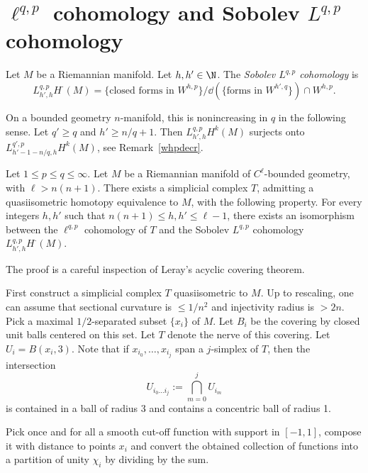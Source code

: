 \section{\texorpdfstring{$\ell^{q,p}$}{ell(q,p)} cohomology and Sobolev \texorpdfstring{$L^{q,p}$}{L(q,p)} cohomology}\label{sec:leray}

\begin{defi}
Let $M$ be a Riemannian manifold. Let $h, h'\in\N$. The
\emph{Sobolev $L^{q,p}$ cohomology} is
\[
L_{h',h}^{q,p}H^{\cdot}(M)=\{\text{closed forms in }W^{h,p}\} / \dd(\{\text{forms in }W^{h',q}\}) \cap W^{h,p}.
\]
\end{defi}

\begin{rema}\label{rem:decreasing}
On a bounded geometry $n$-manifold, this is nonincreasing in $q$ in the following sense. Let $q'\geq q$ and $h'\geq n/q + 1$. Then $L_{h',h}^{q,p}H^{k}(M)$ surjects onto $L_{h'-1 - n/q,h}^{q',p}H^{k}(M)$, see Remark~\ref{whpdecr}.
\end{rema}

\begin{theo}\label{prop:leray}
Let $1\leq p\leq q\leq \infty$. Let $M$ be a Riemannian manifold of $C^\ell$-bounded geometry, with $\ell > n(n+1)$. There exists a simplicial complex $T$, admitting a quasiisometric homotopy equivalence to $M$, with the following property. For every integers $h,h'$ such that $n(n+1) \leq h,h'\leq \ell -1$, there exists an isomorphism between the $\ell^{q,p}$ cohomology of $T$ and the Sobolev $L^{q,p}$ cohomology $L_{h',h}^{q,p}H^{\cdot}(M)$.
\end{theo}

The proof is a careful inspection of Leray's acyclic covering theorem.

First construct a simplicial complex $T$ quasiisometric to $M$. Up to rescaling, one can assume that sectional curvature is $\leq 1/n^2$ and injectivity radius is $>2n$. Pick a maximal $1/2$-separated subset $\{x_i\}$ of $M$. Let $B_i$ be the covering by closed unit balls centered on this set. Let $T$ denote the nerve of this covering. Let $U_i=B(x_i,3)$. Note that if $x_{i_0},\dots,x_{i_j}$ span a $j$-simplex of $T$, then the intersection
\[
U_{{i_0}\dots{i_j}} := \bigcap_{m=0}^{j}U_{i_m}
\]
is contained in a ball of radius 3 and contains a concentric ball of radius 1.

Pick once and for all a smooth cut-off function with support in $[-1,1]$, compose it with distance to points $x_i$ and convert the obtained collection of functions into a partition of unity $\chi_i$ by dividing by the sum.

